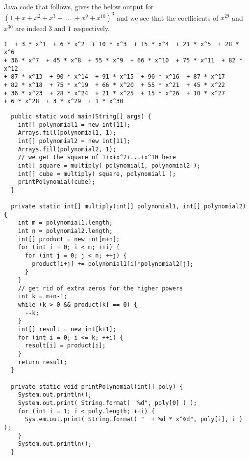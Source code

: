 \documentclass[12pt]{article}
\begin{document}
Java code that follows, gives the below output for $\left( 1+x+x^2+x^3+\ \ldots\ +x^9+x^{10} \right)^3$ and we see that the coefficients of $x^{29}$ and $x^{30}$ are indeed $3$ and $1$ respectively. 

\begin{verbatim}
1  + 3 * x^1  + 6 * x^2  + 10 * x^3  + 15 * x^4  + 21 * x^5  + 28 * x^6  
+ 36 * x^7  + 45 * x^8  + 55 * x^9  + 66 * x^10  + 75 * x^11  + 82 * x^12  
+ 87 * x^13  + 90 * x^14  + 91 * x^15  + 90 * x^16  + 87 * x^17  
+ 82 * x^18  + 75 * x^19  + 66 * x^20  + 55 * x^21  + 45 * x^22  
+ 36 * x^23  + 28 * x^24  + 21 * x^25  + 15 * x^26  + 10 * x^27  
+ 6 * x^28  + 3 * x^29  + 1 * x^30
\end{verbatim}
\begin{verbatim}
  public static void main(String[] args) {
    int[] polynomial1 = new int[11];
    Arrays.fill(polynomial1, 1); 
    int[] polynomial2 = new int[11];
    Arrays.fill(polynomial2, 1);
    // we get the square of 1+x+x^2+...+x^10 here
    int[] square = multiply( polynomial1, polynomial2 );
    int[] cube = multiply( square, polynomial1 );
    printPolynomial(cube);
  }
  
  private static int[] multiply(int[] polynomial1, int[] polynomial2) {
    int m = polynomial1.length;
    int n = polynomial2.length;
    int[] product = new int[m+n];
    for (int i = 0; i < m; ++i) {
      for (int j = 0; j < n; ++j) {
        product[i+j] += polynomial1[i]*polynomial2[j];
      }
    }
    // get rid of extra zeros for the higher powers
    int k = m+n-1;
    while (k > 0 && product[k] == 0) {
      --k;
    }    
    int[] result = new int[k+1];
    for (int i = 0; i <= k; ++i) {
      result[i] = product[i];
    }   
    return result;
  }
  
  private static void printPolynomial(int[] poly) {
    System.out.println();
    System.out.print( String.format( "%d", poly[0] ) );
    for (int i = 1; i < poly.length; ++i) {
      System.out.print( String.format( "  + %d * x^%d", poly[i], i ) );
    }
    System.out.println();
  }
\end{verbatim}
\end{document}
